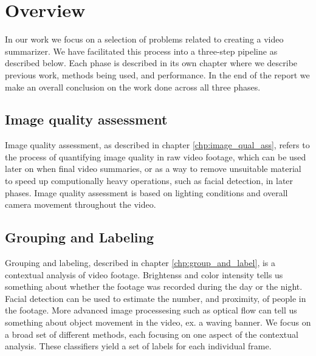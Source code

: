 \section{Overview}
%
In our work we focus on a selection of problems related to creating a video summarizer. We have facilitated this process into a three-step pipeline as described below. Each phase is described in its own chapter where we describe previous work, methods being used, and performance. In the end of the report we make an overall conclusion on the work done across all three phases.
%
\subsection{Image quality assessment}\label{sec:videoclipsegmentation}
%
Image quality assessment, as described in chapter \ref{chp:image_qual_ass}, refers to the process of quantifying image quality in raw video footage, %
which can be used later on when final video summaries, or as a way to remove unsuitable material to speed up computionally heavy operations, such as facial detection, in later phases. %
Image quality assessment is based on lighting conditions and overall camera movement throughout the video.
%
\subsection{Grouping and Labeling}
%
Grouping and labeling, described in chapter \ref{chp:group_and_label}, is a contextual analysis of video footage. 
Brightenss and color intensity tells us something about whether the footage was recorded during the day or the night. Facial detection can be used to estimate the number, and proximity, of people in the footage. 
More advanced image processesing such as optical flow can tell us something about object movement in the video, ex. a waving banner. 
We focus on a broad set of different methods, each focusing on one aspect of the contextual analysis. These classifiers yield a set of labels for each individual frame.
%
